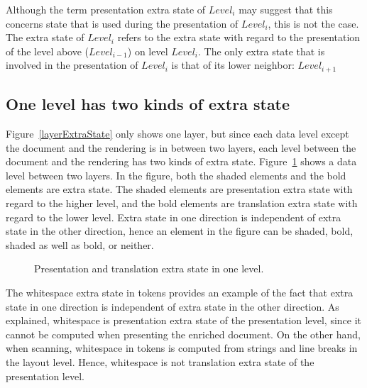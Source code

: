\bc Although the term presentation extra state of $Level_i$ may suggest that this concerns state that is used during the presentation of $Level_i$, this is not the case. The extra state of $Level_i$ refers to the extra state with regard to the presentation of the level above ($Level_{i-1}$) on level $Level_i$. The only extra state that is involved in the presentation of $Level_i$ is that of its lower neighbor: $Level_{i+1}$
\ec


%																
\subsection{One level has two kinds of extra state} \label{sect:oneLevelDoubleES}

Figure~\ref{layerExtraState} only shows one layer, but since each data level except the document and the rendering is in between two layers, each level between the document and the rendering has two kinds of extra state. Figure~\ref{levelExtraState} shows a data level between two layers. In the figure, both the shaded elements and the bold elements are extra state. The shaded elements are presentation extra state with regard to the higher level, and the bold elements are translation extra state with regard to the lower level. Extra state in one direction is independent of extra state in the other direction, hence an element in the figure can be shaded, bold, shaded as well as bold, or neither. 

\begin{figure}
\begin{center}
\begin{center}
\end{center}
\caption{Presentation and translation extra state in one level.}\label{levelExtraState} 
\end{center}
\end{figure}

The whitespace extra state in tokens provides an example of the fact that extra state in one direction is independent of extra state in the other direction. As explained, whitespace is presentation extra state of the presentation level, since it cannot be computed when presenting the enriched document. On the other hand, when scanning, whitespace in tokens is computed from strings and line breaks in the layout level. Hence, whitespace is not translation extra state of the presentation level.


